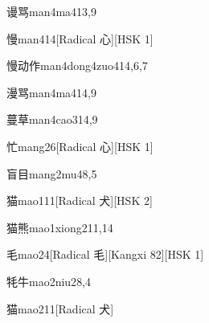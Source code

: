 \begin{entry}{谩骂}{man4ma4}{13,9}
\end{entry}

\begin{entry}{慢}{man4}{14}[Radical 心][HSK 1]
\end{entry}

\begin{entry}{慢动作}{man4dong4zuo4}{14,6,7}
\end{entry}

\begin{entry}{漫骂}{man4ma4}{14,9}
\end{entry}

\begin{entry}{蔓草}{man4cao3}{14,9}
\end{entry}

\begin{entry}{忙}{mang2}{6}[Radical 心][HSK 1]
\end{entry}

\begin{entry}{盲目}{mang2mu4}{8,5}
\end{entry}

\begin{entry}{猫}{mao1}{11}[Radical 犬][HSK 2]
\end{entry}

\begin{entry}{猫熊}{mao1xiong2}{11,14}
\end{entry}

\begin{entry}{毛}{mao2}{4}[Radical 毛][Kangxi 82][HSK 1]
\end{entry}

\begin{entry}{牦牛}{mao2niu2}{8,4}
\end{entry}

\begin{entry}{猫}{mao2}{11}[Radical 犬]
\end{entry}

